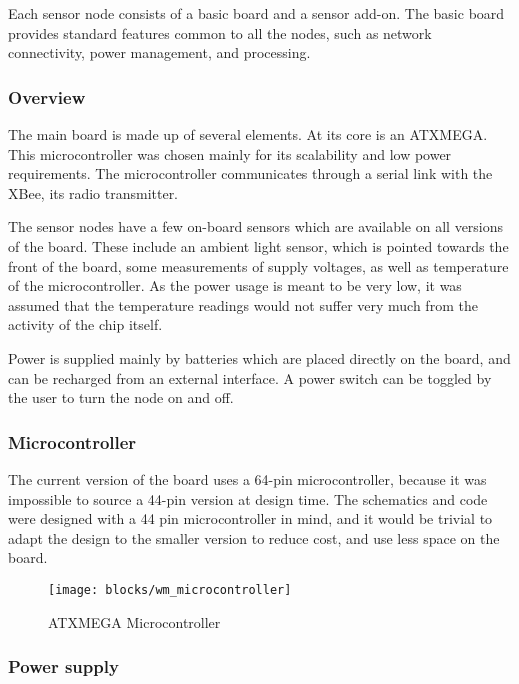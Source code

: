 Each sensor node consists of a basic board and a sensor add-on. The basic board
provides standard features common to all the nodes, such as network
connectivity, power management, and processing.

\subsubsection{Overview}

The main board is made up of several elements. At its core is an ATXMEGA. This
microcontroller was chosen mainly for its scalability and low power
requirements. The microcontroller communicates through a serial link with the
XBee, its radio transmitter.

The sensor nodes have a few on-board sensors which are available on all versions
of the board. These include an ambient light sensor, which is pointed towards
the front of the board, some measurements of supply voltages, as well as
temperature of the microcontroller. As the power usage is meant to be very low,
it was assumed that the temperature readings would not suffer very much from
the activity of the chip itself.

Power is supplied mainly by batteries which are placed directly on the board,
and can be recharged from an external interface. A power switch can be toggled
by the user to turn the node on and off.

\subsubsection{Microcontroller}

The current version of the board uses a 64-pin microcontroller, because it
was impossible to source a 44-pin version at design time. The schematics and
code were designed with a 44 pin microcontroller in mind, and it would be
trivial to adapt the design to the smaller version to reduce cost, and use less
space on the board.

\begin{figure}[htpb]
  \begin{center}
    \texttt{[image: blocks/wm\_microcontroller]}
  \end{center}
  \caption{ATXMEGA Microcontroller}
  \label{fig:microcontroller}
\end{figure}


\subsubsection{Power supply}

